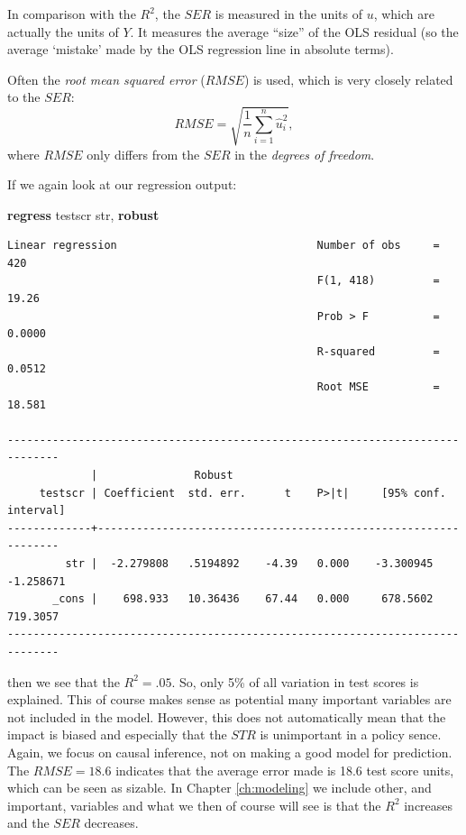 \documentclass[
]{book}
\newenvironment{Shaded}{\begin{snugshade}}{\end{snugshade}}
\newcommand{\KeywordTok}[1]{\textcolor[rgb]{0.13,0.29,0.53}{\textbf{#1}}}
\newcommand{\NormalTok}[1]{#1}
\begin{document}
In comparison with the \(R^2\), the \(SER\) is measured in the units of \(u\), which are actually the units of \(Y\). It measures the average ``size'' of the OLS residual (so the average `mistake' made by the OLS regression line in absolute terms).

Often the \emph{root mean squared error} (\(RMSE\)) is used, which is very closely related to the \(SER\):
\begin{equation}
RMSE = \sqrt{\frac{1}{n} \sum_{i=1}^n \hat{u}_i^2},
\label{eq:rmse}
\end{equation}
where \(RMSE\) only differs from the \(SER\) in the \emph{degrees of freedom}.

If we again look at our regression output:

\begin{Shaded}
\begin{Highlighting}[]
\KeywordTok{regress}\NormalTok{ testscr str, }\KeywordTok{robust}
\end{Highlighting}
\end{Shaded}

\begin{verbatim}
Linear regression                               Number of obs     =        420
                                                F(1, 418)         =      19.26
                                                Prob > F          =     0.0000
                                                R-squared         =     0.0512
                                                Root MSE          =     18.581

------------------------------------------------------------------------------
             |               Robust
     testscr | Coefficient  std. err.      t    P>|t|     [95% conf. interval]
-------------+----------------------------------------------------------------
         str |  -2.279808   .5194892    -4.39   0.000    -3.300945   -1.258671
       _cons |    698.933   10.36436    67.44   0.000     678.5602    719.3057
------------------------------------------------------------------------------
\end{verbatim}

then we see that the \(R^2 = .05\). So, only 5\% of all variation in test scores is explained. This of course makes sense as potential many important variables are not included in the model. However, this does not automatically mean that the impact is biased and especially that the \(STR\) is unimportant in a policy sence. Again, we focus on causal inference, not on making a good model for prediction. The \(RMSE= 18.6\) indicates that the average error made is 18.6 test score units, which can be seen as sizable. In Chapter \ref{ch:modeling} we include other, and important, variables and what we then of course will see is that the \(R^2\) increases and the \(SER\) decreases.
\end{document}
